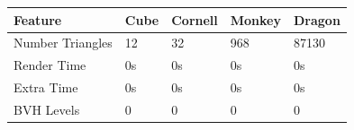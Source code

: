 \documentclass{article}
\begin{document}
    \vspace{5mm}
    
    \noindent\begin{tabular}{ |p{2.8cm}||p{1.6cm}|p{1.6cm}|p{1.6cm}|p{1.6cm}| }
      \hline
      \textbf{Feature} &\textbf{Cube} &\textbf{Cornell} &\textbf{Monkey} &\textbf{Dragon}\\
      \hline
      Number Triangles  &12     &32     &968    &87130\\
      Render Time       &0s     &0s     &0s     &0s\\
      Extra Time        &0s     &0s     &0s     &0s\\
      BVH Levels        &0      &0      &0      &0\\
      \hline
    \end{tabular}
\end{document}

